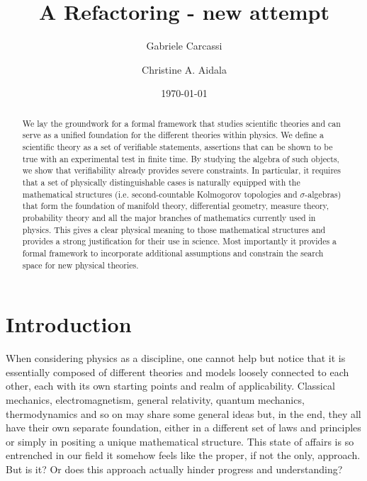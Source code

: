 \documentclass[twocolumn]{article}
\begin{document}
\title{A Refactoring - new attempt}


\author[1]{Gabriele Carcassi}
\author[1]{Christine A. Aidala}

\date{\today}

\maketitle


\begin{abstract}
	We lay the groundwork for a formal framework that studies scientific theories and can serve as a unified foundation for the different theories within physics. We define a scientific theory as a set of verifiable statements, assertions that can be shown to be true with an experimental test in finite time. By studying the algebra of such objects, we show that verifiability already provides severe constraints. In particular, it requires that a set of physically distinguishable cases is naturally equipped with the mathematical structures (i.e. second-countable Kolmogorov topologies and $\sigma$-algebras) that form the foundation of manifold theory, differential geometry, measure theory, probability theory and all the major branches of mathematics currently used in physics. This gives a clear physical meaning to those mathematical structures and provides a strong justification for their use in science. Most importantly it provides a formal framework to incorporate additional assumptions and constrain the search space for new physical theories.
\end{abstract}


\section{Introduction}

When considering physics as a discipline, one cannot help but notice that it is essentially composed of different theories and models loosely connected to each other, each with its own starting points and realm of applicability. Classical mechanics, electromagnetism, general relativity, quantum mechanics, thermodynamics and so on may share some general ideas but, in the end, they all have their own separate foundation, either in a different set of laws and principles or simply in positing a unique mathematical structure. This state of affairs is so entrenched in our field it somehow feels like the proper, if not the only, approach. But is it? Or does this approach actually hinder progress and understanding?
\end{document}

